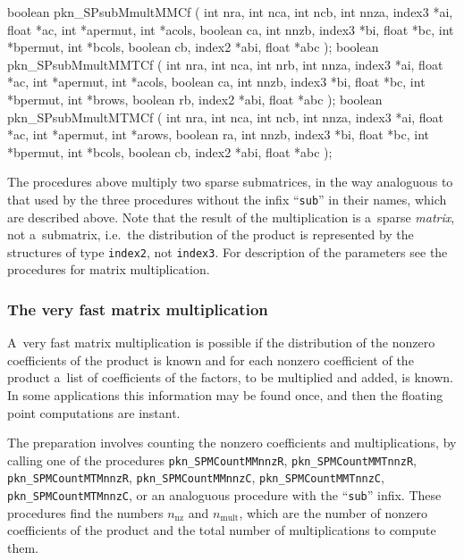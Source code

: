 \medskip
\begin{listingC}
boolean pkn_SPsubMmultMMCf ( int nra, int nca, int ncb,
                             int nnza, index3 *ai, float *ac,
                             int *apermut, int *acols, boolean ca,
                             int nnzb, index3 *bi, float *bc,
                             int *bpermut, int *bcols, boolean cb,
                             index2 *abi, float *abc );
boolean pkn_SPsubMmultMMTCf ( int nra, int nca, int nrb,
                              int nnza, index3 *ai, float *ac,
                              int *apermut, int *acols, boolean ca,
                              int nnzb, index3 *bi, float *bc,
                              int *bpermut, int *brows, boolean rb,
                              index2 *abi, float *abc );
boolean pkn_SPsubMmultMTMCf ( int nra, int nca, int ncb,
                              int nnza, index3 *ai, float *ac,
                              int *apermut, int *arows, boolean ra,
                              int nnzb, index3 *bi, float *bc,
                              int *bpermut, int *bcols, boolean cb,
                              index2 *abi, float *abc );
\end{listingC}
The procedures above multiply two sparse submatrices, in the way analoguous
to that used by the three procedures without the infix ``\texttt{sub}'' in
their names, which are described above. Note that the result of the
multiplication is a~sparse \emph{matrix}, not a~submatrix, i.e.\ the
distribution of the product is represented by the structures of type
\texttt{index2}, not \texttt{index3}. For description of the parameters see
the procedures for matrix multiplication.


\subsubsection{The very fast matrix multiplication}

A~very fast matrix multiplication is possible if the distribution of the
nonzero coefficients of the product is known and for each nonzero
coefficient of the product a~list of coefficients of the factors, to be
multiplied and added, is known. In some applications this information may be
found once, and then the floating point computations are instant.

\begin{sloppypar}
The preparation involves counting the nonzero coefficients and
multiplications, by calling one of the procedures
\texttt{pkn\_SPMCountMMnnzR}, \texttt{pkn\_SPMCountMMTnnzR},
\texttt{pkn\_SPMCountMTMnnzR}, \texttt{pkn\_SPMCountMMnnzC},
\texttt{pkn\_SPMCountMMTnnzC}, \texttt{pkn\_SPMCountMTMnnzC}, or an
analoguous procedure with the ``\texttt{sub}'' infix.
These procedures find the numbers $n_{\mathrm{nz}}$ and $n_{\mathrm{mult}}$,
which are the number of nonzero coefficients of the product and the total
number of multiplications to compute them.%
\end{sloppypar}

